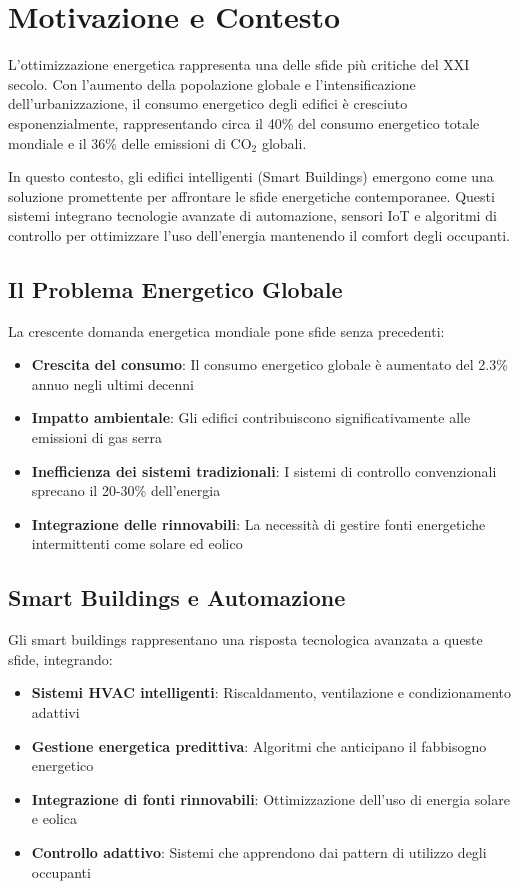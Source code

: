 \documentclass[12pt,a4paper,twoside]{report}
\begin{document}
\section{Motivazione e Contesto}

L'ottimizzazione energetica rappresenta una delle sfide più critiche del XXI secolo. Con l'aumento della popolazione globale e l'intensificazione dell'urbanizzazione, il consumo energetico degli edifici è cresciuto esponenzialmente, rappresentando circa il 40\% del consumo energetico totale mondiale e il 36\% delle emissioni di CO$_2$ globali.

In questo contesto, gli edifici intelligenti (Smart Buildings) emergono come una soluzione promettente per affrontare le sfide energetiche contemporanee. Questi sistemi integrano tecnologie avanzate di automazione, sensori IoT e algoritmi di controllo per ottimizzare l'uso dell'energia mantenendo il comfort degli occupanti.

\subsection{Il Problema Energetico Globale}

La crescente domanda energetica mondiale pone sfide senza precedenti:

\begin{itemize}
    \item \textbf{Crescita del consumo}: Il consumo energetico globale è aumentato del 2.3\% annuo negli ultimi decenni
    \item \textbf{Impatto ambientale}: Gli edifici contribuiscono significativamente alle emissioni di gas serra
    \item \textbf{Inefficienza dei sistemi tradizionali}: I sistemi di controllo convenzionali sprecano il 20-30\% dell'energia
    \item \textbf{Integrazione delle rinnovabili}: La necessità di gestire fonti energetiche intermittenti come solare ed eolico
\end{itemize}

\subsection{Smart Buildings e Automazione}

Gli smart buildings rappresentano una risposta tecnologica avanzata a queste sfide, integrando:

\begin{itemize}
    \item \textbf{Sistemi HVAC intelligenti}: Riscaldamento, ventilazione e condizionamento adattivi
    \item \textbf{Gestione energetica predittiva}: Algoritmi che anticipano il fabbisogno energetico
    \item \textbf{Integrazione di fonti rinnovabili}: Ottimizzazione dell'uso di energia solare e eolica
    \item \textbf{Controllo adattivo}: Sistemi che apprendono dai pattern di utilizzo degli occupanti
\end{itemize}
\end{document}
